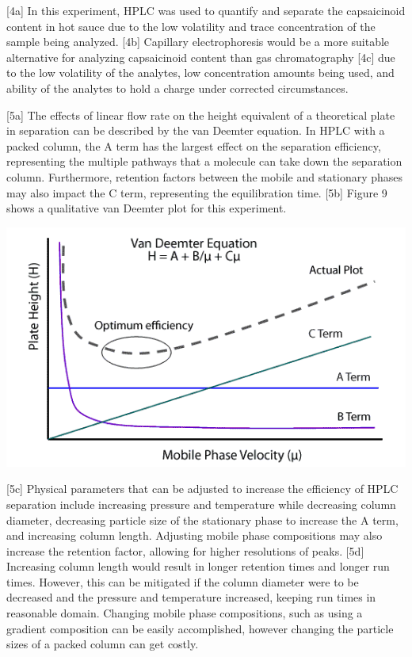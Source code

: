 \documentclass{article}
\begin{document}
\begin{multicols}{2}
{[4a] In this experiment, HPLC was used to quantify and separate the capsaicinoid
content in hot sauce due to the low volatility and trace concentration of the
sample being analyzed.
[4b] Capillary electrophoresis would be a more suitable alternative for
analyzing capsaicinoid content than gas chromatography 
[4c] due to the low volatility of the analytes, low concentration amounts being
used, and ability of the analytes to hold a charge under corrected
circumstances.

[5a] The effects of linear flow rate on the height equivalent of a theoretical
plate in separation can be described by the van Deemter equation. In HPLC with a
packed column, the A term has the largest effect on
the separation efficiency, representing the multiple pathways that a molecule
can take down the separation column. Furthermore, retention factors between the mobile and
stationary phases may also impact the C term, representing the equilibration
time.
[5b] Figure 9 shows a qualitative van Deemter plot for this experiment.
\begin{center}
    \includegraphics[scale=0.4]{vanDeemter}
\end{center}
[5c] Physical parameters that can be adjusted to increase the efficiency of HPLC
separation include increasing pressure and temperature while decreasing column
diameter, decreasing particle size of the stationary phase to increase the A
term, and increasing column length. Adjusting mobile phase compositions may also
increase the retention factor, allowing for higher resolutions of peaks.
[5d] Increasing column length would result in longer retention times and longer
run times. However, this can be mitigated if the column diameter were to be
decreased and the pressure and temperature increased, keeping run times in
reasonable domain. Changing mobile phase compositions, such as using a gradient
composition can be easily accomplished, however changing the particle sizes of a
packed column can get costly.

}
\end{multicols}
\end{document}
